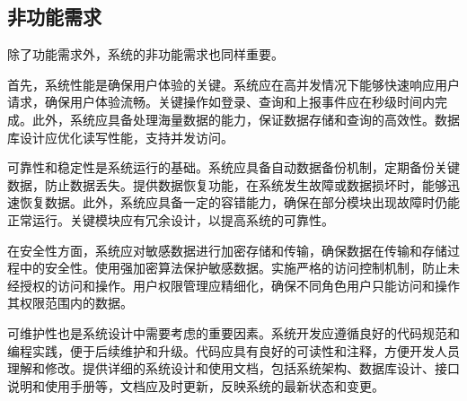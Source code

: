 \subsection{非功能需求}

除了功能需求外，系统的非功能需求也同样重要。

首先，系统性能是确保用户体验的关键。系统应在高并发情况下能够快速响应用户请求，确保用户体验流畅。关键操作如登录、查询和上报事件应在秒级时间内完成。此外，系统应具备处理海量数据的能力，保证数据存储和查询的高效性。数据库设计应优化读写性能，支持并发访问。

可靠性和稳定性是系统运行的基础。系统应具备自动数据备份机制，定期备份关键数据，防止数据丢失。提供数据恢复功能，在系统发生故障或数据损坏时，能够迅速恢复数据。此外，系统应具备一定的容错能力，确保在部分模块出现故障时仍能正常运行。关键模块应有冗余设计，以提高系统的可靠性。

在安全性方面，系统应对敏感数据进行加密存储和传输，确保数据在传输和存储过程中的安全性。使用强加密算法保护敏感数据。实施严格的访问控制机制，防止未经授权的访问和操作。用户权限管理应精细化，确保不同角色用户只能访问和操作其权限范围内的数据。

可维护性也是系统设计中需要考虑的重要因素。系统开发应遵循良好的代码规范和编程实践，便于后续维护和升级。代码应具有良好的可读性和注释，方便开发人员理解和修改。提供详细的系统设计和使用文档，包括系统架构、数据库设计、接口说明和使用手册等，文档应及时更新，反映系统的最新状态和变更。

